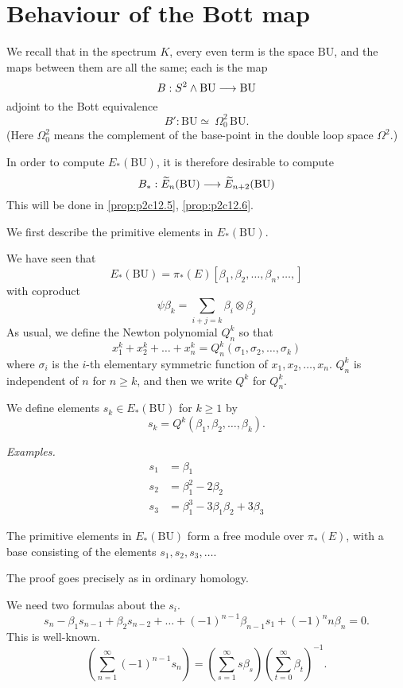 \documentclass[../main]{subfiles}
\begin{document}
\label{sec:p2c12}

\chapter{Behaviour of the Bott map}
We recall that in the spectrum $K$, every even term is the space $\mathrm{BU}$, and the maps between them are all the same; each is the map $$B:S^2\wedge \mathrm{BU} \longrightarrow  \mathrm{BU}$$ adjoint to the Bott equivalence $$B':\mathrm{BU}\simeq\:\Omega^2_0\,\mathrm{BU}.$$%
(Here $\Omega^2_0$ means the complement of the base-point in the double loop space $\Omega^2$.)

In order to compute $E_\ast(\mathrm{BU})$, it is therefore desirable to compute $$B_\ast:\widetilde{E}_n(\mathrm{BU}) \longrightarrow \widetilde{E}_{n+2}( \mathrm{BU})$$
This will be done in \eqref{prop:p2c12.5}, \eqref{prop:p2c12.6}.

We first describe the primitive elements in $E_\ast(\mathrm{BU})$.

We have seen that $$E_\ast(\mathrm{BU}) = \pi_\ast(E)[\beta_1, \beta_2, \dots, \beta_n, \dots,]$$ with coproduct
$$\psi\beta_k = \sum_{i+j=k}\beta_i\otimes\beta_j$$
As usual, we define the Newton polynomial $Q_n^k$ so that $$x_1^k + x_2^k + \dots + x_n^k = Q^k_n(\sigma_1, \sigma_2, \dots, \sigma_k)$$ where $\sigma_i$ is the $i$-th elementary symmetric function of $x_1, x_2, \dots, x_n$. $Q_n^k$ is independent of $n$ for $n\ge k$, and then we write $Q^k$ for $Q_n^k$.

We define elements $s_k \in E_\ast(\mathrm{BU})$ for $k\ge 1$ by $$s_k = Q^k(\beta_1, \beta_2, \dots, \beta_k).$$

\emph{Examples.}
\begin{align*}
s_1 &= \beta_1\\
s_2 &= \beta_1^2 - 2\beta_2\\
s_3 &= \beta_1^3 - 3\beta_1\beta_2 + 3\beta_3
\end{align*}

\begin{proposition}
\label{prop:p2c12.1}
The primitive elements in $E_\ast( \mathrm{BU})$ form a free module over $\pi_\ast(E)$, with a base consisting of the elements $s_1, s_2, s_3, \dots$.

The proof goes precisely as in ordinary homology. 

We need two formulas about the $s_i$.
\begin{equation}
\label{eqn:p2c12.2}
\tag{12.2}
s_n - \beta_1 s_{n-1} + \beta_2 s_{n-2} + \dots + (-1)^{n-1}\beta_{n-1} s_1 + (-1)^n n\beta_n = 0.
\end{equation}
This is well-known.
\begin{equation}
\label{eqn:p2c12.3}
\tag{12.3}
\left(\sum^\infty_{n=1} (-1)^{n-1}s_n\right) = \left(\sum^\infty_{s=1}s\beta_s\right)\left(\sum^\infty_{t=0}\beta_t\right)^{-1}.
\end{equation}
\end{proposition}
\end{document}
